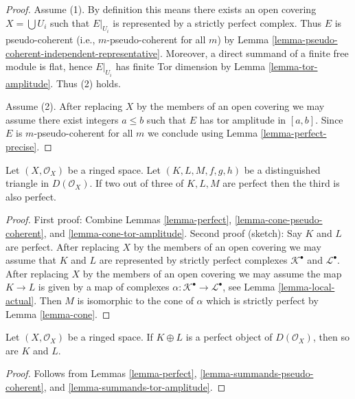 \begin{proof}
Assume (1). By definition this means there exists an open covering
$X = \bigcup U_i$ such that $E|_{U_i}$ is represented by a
strictly perfect complex. Thus $E$ is pseudo-coherent (i.e.,
$m$-pseudo-coherent for all $m$) by
Lemma \ref{lemma-pseudo-coherent-independent-representative}.
Moreover, a direct summand of a finite free module is flat, hence
$E|_{U_i}$ has finite Tor dimension by
Lemma \ref{lemma-tor-amplitude}. Thus (2) holds.

\medskip\noindent
Assume (2). After replacing $X$ by the members of an open covering
we may assume there exist integers $a \leq b$ such that $E$
has tor amplitude in $[a, b]$. Since $E$ is $m$-pseudo-coherent
for all $m$ we conclude using Lemma \ref{lemma-perfect-precise}.
\end{proof}

\begin{lemma}
\label{lemma-two-out-of-three-perfect}
Let $(X, \mathcal{O}_X)$ be a ringed space. Let $(K, L, M, f, g, h)$
be a distinguished triangle in $D(\mathcal{O}_X)$. If two out of three of
$K, L, M$ are perfect then the third is also perfect.
\end{lemma}

\begin{proof}
First proof: Combine
Lemmas \ref{lemma-perfect}, \ref{lemma-cone-pseudo-coherent}, and
\ref{lemma-cone-tor-amplitude}.
Second proof (sketch): Say $K$ and $L$ are perfect. After replacing
$X$ by the members of an open covering we may assume that $K$ and $L$
are represented by strictly perfect complexes $\mathcal{K}^\bullet$
and $\mathcal{L}^\bullet$. After replacing $X$ by the members
of an open covering we may assume the map $K \to L$ is given by
a map of complexes $\alpha : \mathcal{K}^\bullet \to \mathcal{L}^\bullet$,
see Lemma \ref{lemma-local-actual}.
Then $M$ is isomorphic to the cone of $\alpha$ which is strictly
perfect by Lemma \ref{lemma-cone}.
\end{proof}

\begin{lemma}
\label{lemma-summands-perfect}
Let $(X, \mathcal{O}_X)$ be a ringed space.
If $K \oplus L$ is a perfect object of $D(\mathcal{O}_X)$, then
so are $K$ and $L$.
\end{lemma}

\begin{proof}
Follows from
Lemmas \ref{lemma-perfect}, \ref{lemma-summands-pseudo-coherent}, and
\ref{lemma-summands-tor-amplitude}.
\end{proof}

